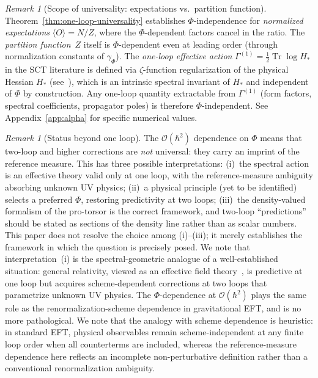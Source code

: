 \documentclass[12pt,a4paper]{article}
\theoremstyle{plain}
\theoremstyle{definition}
\theoremstyle{remark}
\newtheorem{remark}[theorem]{Remark}
\newcommand{\Tr}{\operatorname{Tr}}
\newcommand{\half}{\tfrac{1}{2}}
\newcommand{\order}{\mathcal{O}}
\begin{document}
\begin{remark}[Scope of universality: expectations vs.\ partition
function]
\label{rem:univ-scope}
Theorem~\ref{thm:one-loop-universality} establishes
$\Phi$-independence for \emph{normalized expectations}
$\langle O\rangle = N/Z$, where the $\Phi$-dependent factors cancel in
the ratio.  The \emph{partition function}~$Z$ itself is
$\Phi$-dependent even at leading order (through normalization constants
of $\gamma_\Phi$).  The \emph{one-loop effective action}
$\Gamma^{(1)} = \half\Tr\log H_*$ in the SCT literature is defined via
$\zeta$-function regularization of the physical Hessian $H_*$
(see~\cite{Alfyorov:2026ff}), which is an intrinsic spectral invariant
of $H_*$ and independent of $\Phi$ by construction.  Any one-loop
quantity extractable from $\Gamma^{(1)}$ (form factors, spectral
coefficients, propagator poles) is therefore $\Phi$-independent.
See Appendix~\ref{app:alpha} for specific numerical values.
\end{remark}

\begin{remark}[Status beyond one loop]
\label{rem:beyond-one-loop}
The $\order(\hbar^2)$ dependence on $\Phi$ means that two-loop and
higher corrections are \emph{not} universal: they carry an imprint of
the reference measure.  This has three possible interpretations:
(i)~the spectral action is an effective theory valid only at one loop,
with the reference-measure ambiguity absorbing unknown UV physics;
(ii)~a physical principle (yet to be identified) selects a preferred
$\Phi$, restoring predictivity at two loops;
(iii)~the density-valued formalism of the pro-torsor is the
correct framework, and two-loop ``predictions'' should be stated as
sections of the density line rather than as scalar numbers.
This paper does not resolve the choice among (i)--(iii); it merely
establishes the framework in which the question is precisely posed.
We note that interpretation~(i) is the spectral-geometric analogue of
a well-established situation: general relativity, viewed as an
effective field theory~\cite{Donoghue:1994}, is predictive at one loop
but acquires scheme-dependent corrections at two loops that parametrize
unknown UV physics.  The $\Phi$-dependence at $\order(\hbar^2)$ plays
the same role as the renormalization-scheme dependence in gravitational
EFT, and is no more pathological.
We note that the analogy with scheme dependence is heuristic: in
standard EFT, physical observables remain scheme-independent at any
finite loop order when all counterterms are included, whereas the
reference-measure dependence here reflects an incomplete
non-perturbative definition rather than a conventional
renormalization ambiguity.
\end{remark}
\end{document}

